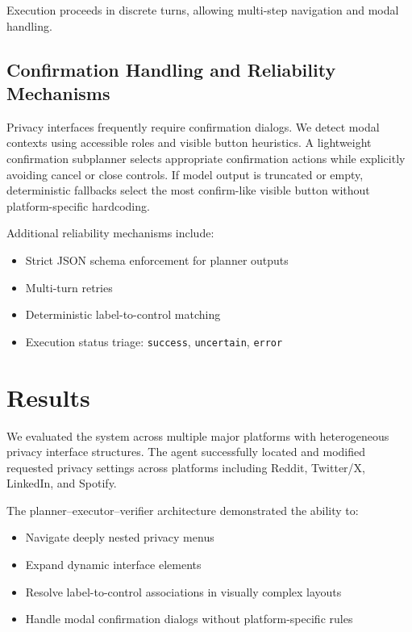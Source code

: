 \documentclass[12pt,letterpaper]{article}
\begin{document}
    Execution proceeds in discrete turns, allowing multi-step navigation and modal handling.
    
    \subsection{Confirmation Handling and Reliability Mechanisms}
    
    Privacy interfaces frequently require confirmation dialogs. We detect modal contexts using accessible roles and visible button heuristics. A lightweight confirmation subplanner selects appropriate confirmation actions while explicitly avoiding cancel or close controls. If model output is truncated or empty, deterministic fallbacks select the most confirm-like visible button without platform-specific hardcoding.
    
    Additional reliability mechanisms include:
    
    \begin{itemize}
        \item Strict JSON schema enforcement for planner outputs
        \item Multi-turn retries
        \item Deterministic label-to-control matching
        \item Execution status triage: \texttt{success}, \texttt{uncertain}, \texttt{error}
    \end{itemize}
    


\section{Results }
We evaluated the system across multiple major platforms with heterogeneous privacy interface structures. The agent successfully located and modified requested privacy settings across platforms including Reddit, Twitter/X, LinkedIn, and Spotify.

The planner–executor–verifier architecture demonstrated the ability to:

\begin{itemize}
    \item Navigate deeply nested privacy menus
    \item Expand dynamic interface elements
    \item Resolve label-to-control associations in visually complex layouts
    \item Handle modal confirmation dialogs without platform-specific rules
\end{itemize}
\end{document}
